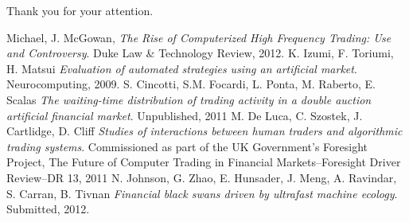 \documentclass[14pt]{beamer}
\begin{document}
\begin{frame}
\begin{center}
\Large
Thank you for your attention.
\end{center}
\end{frame}





\begin{thebibliography}{Selected bibliography}
\scriptsize
{}
  Michael, J. McGowan,
  \emph{The Rise of Computerized High Frequency Trading: Use and Controversy}.
  Duke Law \& Technology Review,
  2012.
  K. Izumi, F. Toriumi, H. Matsui
  \emph{Evaluation of automated strategies using an artificial market}.
  Neurocomputing,
  2009.
  S. Cincotti, S.M. Focardi, L. Ponta, M. Raberto, E. Scalas
  \emph{The waiting-time distribution of trading activity in a double auction artificial financial market}. Unpublished, 2011
  M. De Luca, C. Szostek, J. Cartlidge, D. Cliff
  \emph{Studies of interactions between human traders and algorithmic trading systems}.
  Commissioned as part of the UK {Government's} Foresight Project, The Future of Computer Trading in Financial Markets--Foresight Driver Review--DR 13, 2011
  N. Johnson, G. Zhao, E. Hunsader, J. Meng, A. Ravindar, S. Carran, B. Tivnan
  \emph{Financial black swans driven by ultrafast machine ecology}.
  Submitted, 2012.
\end{thebibliography}
\end{document}
